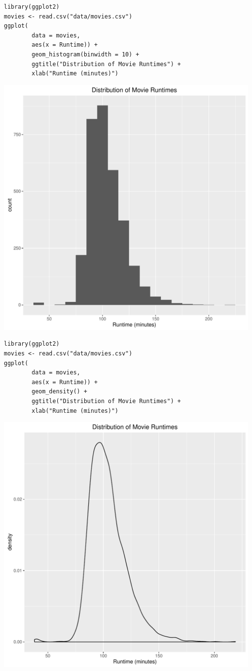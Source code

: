 \documentclass[a4paper, captions=tableheading]{tufte-book}
\begin{document}
\begin{verbatim}
library(ggplot2)
movies <- read.csv("data/movies.csv")
ggplot(
		data = movies,
		aes(x = Runtime)) +
		geom_histogram(binwidth = 10) +
		ggtitle("Distribution of Movie Runtimes") +
		xlab("Runtime (minutes)")
\end{verbatim}

\includegraphics[width=.9\linewidth]{img/1-num-ggplot2-03.pdf}


\begin{verbatim}
library(ggplot2)
movies <- read.csv("data/movies.csv")
ggplot(
		data = movies,
		aes(x = Runtime)) +
		geom_density() +
		ggtitle("Distribution of Movie Runtimes") +
		xlab("Runtime (minutes)")
\end{verbatim}

\includegraphics[width=.9\linewidth]{img/1-num-ggplot2-04.pdf}
\end{document}
